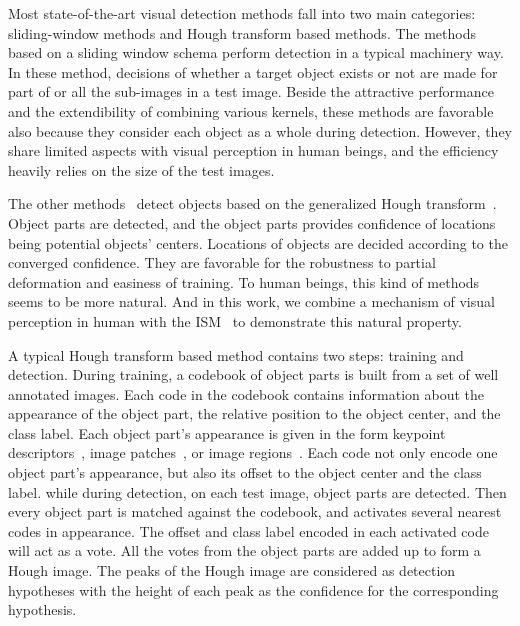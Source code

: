 Most state-of-the-art visual
 detection methods fall into two main categories: sliding-window methods and Hough transform based methods. The methods~\citep{ac4,ac1} based on a sliding window schema perform detection in a typical machinery way. In these method, decisions of whether a target object exists or not are made for part of or all the sub-images in a test image. Beside the attractive performance and the extendibility of combining various kernels, these methods are favorable also because they consider each object as a whole during detection. However, they share limited aspects with visual perception in human beings, and the efficiency heavily relies on the size of the test images.

The other methods~\citep{lb1,ac2,ac3,ac18} detect objects based on the generalized Hough transform~\citep{ac17}. Object parts are detected, and the object parts provides confidence of locations being potential objects' centers. Locations of objects are decided according to the converged confidence. They are favorable for the robustness to partial deformation and easiness of training. To human beings, this kind of methods seems to be more natural. And in this work, we combine a mechanism of visual perception in human with the ISM~\citep{lb1} to demonstrate this natural property.





A typical Hough transform based method contains two steps: training and detection. During training, a codebook of object parts is built from a set of well annotated images. Each code in the codebook contains information about the appearance of the object part, the relative position to the object center, and the class label. Each object part's appearance is given in the form keypoint descriptors~\citep{lb1}, image patches~\citep{ac6,ac7}, or image regions~\citep{ac8}. Each code not only encode one object part's appearance, but also its offset to the  object center and the class label. while during detection, on each test image, object parts are detected. Then every object part is matched against the codebook, and activates several nearest codes in appearance. The offset and class label encoded in each activated code will act as a vote. All the votes from the object parts are added up to form a Hough image. The peaks of the Hough image are considered as detection hypotheses with the height of each peak as the confidence for the corresponding hypothesis.

